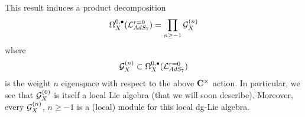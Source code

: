 \documentclass[../main.tex]{subfiles}
\begin{document}
 
This result induces a product decomposition 
\begin{equation}
\label{eqn:Gdecomp}
\Omega^{0,\bullet}_{X} (\mathcal{L}^{{r=0}}_{AdS_7}) = \prod_{n \geq -1} \mathcal{G}_{X}^{(n)}
\end{equation}
where
\[
\mathcal{G}_X^{(n)}\subset \Omega^{0,\bullet}_{X} (\mathcal{L}^{{r=0}}_{AdS_7} )
\]
is the weight $n$ eigenspace with respect to the above $\mathbf{C}^\times$ action.  
In particular, we see that $\mathcal{G}^{(0)}_{X}$ is itself a local Lie algebra (that we will soon describe). 
Moreover, every $\mathcal{G}_{X}^{(n)}$, $n \geq -1$ is a (local) module for this local dg-Lie algebra.

\end{document}
